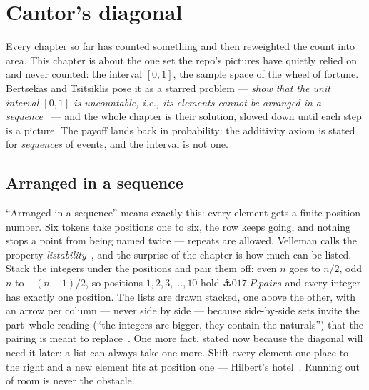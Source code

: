 \chapter{Cantor's diagonal}

\begin{narrative}
Every chapter so far has counted something and then reweighted the
count into area. This chapter is about the one set the repo's pictures
have quietly relied on and never counted: the interval $[0,1]$, the
sample space of the wheel of fortune. Bertsekas and Tsitsiklis pose it
as a starred problem — \emph{show that the unit interval $[0,1]$ is
uncountable, i.e., its elements cannot be arranged in a
sequence}~\cite{probability-bertsekas-and-tsitsiklis-introduction-to-probability-2nd-ed} —
and the whole chapter is their solution, slowed down until each step is
a picture. The payoff lands back in probability: the additivity axiom is
stated for \emph{sequences} of events, and the interval is not one.

\section{Arranged in a sequence}

``Arranged in a sequence'' means exactly this: every element gets a
finite position number. Six tokens take positions one to six, the row
keeps going, and nothing stops a point from being named twice —
repeats are allowed. Velleman calls the property
\emph{listability}~\cite{probability-daniel-j-velleman-how-to-prove-it-2nd-ed-cambridge-2006-ch-7},
and the surprise of the chapter is how much can be listed. Stack the
integers under the positions and pair them off: even $n$ goes to $n/2$,
odd $n$ to $-(n-1)/2$, so positions $1, 2, 3, \ldots, 10$ hold
$\anchor{017.P.pairs}$ and every integer has exactly one position. The
lists are drawn stacked, one above the other, with an arrow per column —
never side by side — because side-by-side sets invite the part–whole
reading (``the integers are bigger, they contain the naturals'') that
the pairing is meant to
replace~\cite{probability-tsamir-and-tirosh-consistency-and-representations-jrme-30-19}.
One more fact, stated now because the diagonal will need it later: a
list can always take one more. Shift every element one place to the
right and a new element fits at position one — Hilbert's
hotel~\cite{probability-wikipedia-hilbert-s-paradox-of-the-grand-hotel}.
Running out of room is never the obstacle.


\end{narrative}
